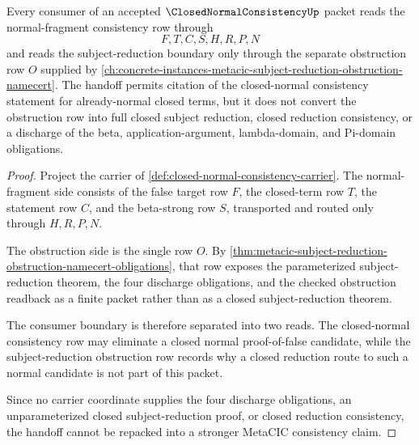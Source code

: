\begin{theorem}
\label{thm:closed-normal-consistency-subject-reduction-obstruction-handoff}
Every consumer of an accepted $\ClosedNormalConsistencyUp$ packet reads the
normal-fragment consistency row through
$$
F,T,C,S,H,R,P,N
$$
and reads the subject-reduction boundary only through the separate obstruction
row $O$ supplied by
\autoref{ch:concrete-instances-metacic-subject-reduction-obstruction-namecert}.
The handoff permits citation of the closed-normal consistency statement for
already-normal closed terms, but it does not convert the obstruction row into
full closed subject reduction, closed reduction consistency, or a discharge of
the beta, application-argument, lambda-domain, and Pi-domain obligations.
\end{theorem}
\begin{proof}
Project the carrier of \autoref{def:closed-normal-consistency-carrier}. The
normal-fragment side consists of the false target row $F$, the closed-term row
$T$, the statement row $C$, and the beta-strong row $S$, transported and routed
only through $H,R,P,N$.

The obstruction side is the single row $O$. By
\autoref{thm:metacic-subject-reduction-obstruction-namecert-obligations}, that
row exposes the parameterized subject-reduction theorem, the four discharge
obligations, and the checked obstruction readback as a finite packet rather
than as a closed subject-reduction theorem.

The consumer boundary is therefore separated into two reads. The
closed-normal consistency row may eliminate a closed normal proof-of-false
candidate, while the subject-reduction obstruction row records why a closed
reduction route to such a normal candidate is not part of this packet.

Since no carrier coordinate supplies the four discharge obligations, an
unparameterized closed subject-reduction proof, or closed reduction
consistency, the handoff cannot be repacked into a stronger MetaCIC consistency
claim.
\end{proof}
